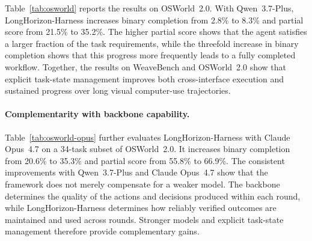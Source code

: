\begin{table}[t]
\centering
\footnotesize
\setlength{\tabcolsep}{5pt}
\renewcommand{\arraystretch}{1.15}
\caption{\textbf{OSWorld~2.0 Opus~4.7 subset (34 tasks).}
Both rows use Claude Opus~4.7 as the backbone.}
\label{tab:osworld-opus}

\end{table}


Table~\ref{tab:osworld} reports the results on OSWorld~2.0. With Qwen~3.7-Plus, LongHorizon-Harness increases binary completion from 2.8\% to 8.3\% and partial score from 21.5\% to 35.2\%. The higher partial score shows that the agent satisfies a larger fraction of the task requirements, while the threefold increase in binary completion shows that this progress more frequently leads to a fully completed workflow. Together, the results on WeaveBench and OSWorld~2.0 show that explicit task-state management improves both cross-interface execution and sustained progress over long visual computer-use trajectories.


\paragraph{Complementarity with backbone capability.}
Table~\ref{tab:osworld-opus} further evaluates LongHorizon-Harness with Claude Opus~4.7 on a 34-task subset of OSWorld~2.0. It increases binary completion from 20.6\% to 35.3\% and partial score from 55.8\% to 66.9\%. The consistent improvements with Qwen~3.7-Plus and Claude Opus~4.7 show that the framework does not merely compensate for a weaker model. The backbone determines the quality of the actions and decisions produced within each round, while LongHorizon-Harness determines how reliably verified outcomes are maintained and used across rounds. Stronger models and explicit task-state management therefore provide complementary gains.


